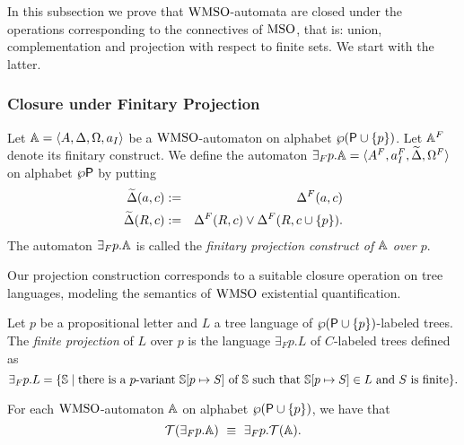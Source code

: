 In this subsection we prove that $\mathrm{WMSO}$-automata are closed under the 
operations corresponding to the connectives of $\mathrm{MSO}$, that is: union, 
complementation and projection with respect to finite sets.
We start with the latter.




\subsubsection{Closure under Finitary Projection}

\begin{definition}\label{DEF_fin_projection}
Let $\mathbb{A} = \langle{A, \Delta, \Omega, a_I}\rangle$ be a $\mathrm{WMSO}$-automaton on alphabet $\wp(\mathsf{P} \cup \{p\})$. Let $\mathbb{A}^{F}$
denote its finitary construct.
We define the automaton ${{\exists}_F p}.\mathbb{A} = \langle A^{F}, a_I^{F},
\widetilde{\Delta}, \Omega^{F}\rangle$ on alphabet $\wp\mathsf{P}$ by putting
\begin{eqnarray*}
  \widetilde{\Delta}(a,c) &:=& \Delta^{F}(a,c)\\
  \widetilde{\Delta}(R,c) &:=& \Delta^{F}(R,c) \vee \Delta^{F}(R,c\cup\{p\}).
\end{eqnarray*}
The automaton ${{\exists}_F p}.\mathbb{A}$ is called the \emph{finitary projection
construct of $\mathbb{A}$ over $p$}.
\end{definition}

Our projection construction corresponds to a suitable closure operation on tree languages, modeling the semantics of $\mathrm{WMSO}$ existential quantification.

\begin{definition}\label{def:tree_finproj} Let $p$ be a propositional letter and $L$ a tree language of $\wp (\mathsf{P}\cup\{p\})$-labeled trees. The \emph{finite projection} of $L$ over $p$ is the language ${\exists}_F p.L$ of $C$-labeled trees defined as
\begin{equation*}
    {\exists}_F p.L = \{\model \mid \text{there is a $p$-variant } \model[p\mapsto S] \text{ of } \model \text{ such that } \model[p\mapsto S] \in L \text{ and } S \text{ is finite} \}.
\end{equation*}\hfill
\end{definition}

\begin{lemma}\label{PROP_fin_projection}
For each $\mathrm{WMSO}$-automaton $\mathbb{A}$ on alphabet $\wp (\mathsf{P} \cup \{p\})$,
we have that
$$\mathcal{T}({{\exists}_F p}.\mathbb{A}) \ \equiv\
{{\exists}_F p}.\mathcal{T}(\mathbb{A}).
$$
\end{lemma}

